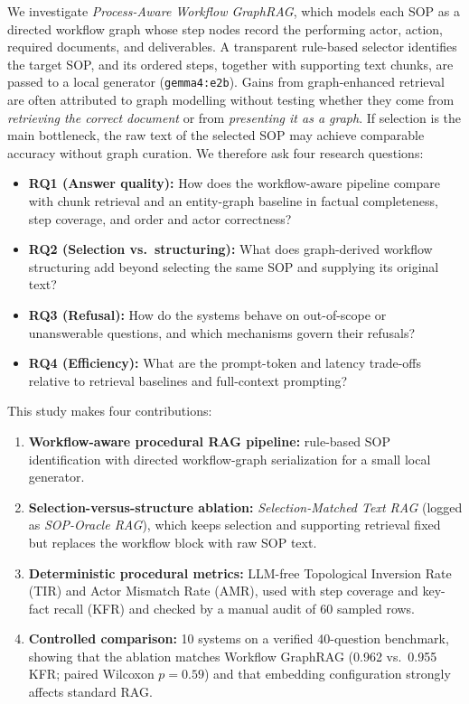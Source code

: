 \documentclass[preprint,10pt]{elsarticle}
\begin{document}
We investigate \emph{Process-Aware Workflow GraphRAG}, which models each SOP as a directed workflow graph \cite{dumas2018fundamentals} whose step nodes record the performing actor, action, required documents, and deliverables. A transparent rule-based selector identifies the target SOP, and its ordered steps, together with supporting text chunks, are passed to a local generator (\texttt{gemma4:e2b}). Gains from graph-enhanced retrieval are often attributed to graph modelling without testing whether they come from \emph{retrieving the correct document} or from \emph{presenting it as a graph}. If selection is the main bottleneck, the raw text of the selected SOP may achieve comparable accuracy without graph curation. We therefore ask four research questions:
\begin{itemize}[leftmargin=*]
\item \textbf{RQ1 (Answer quality):} How does the workflow-aware pipeline compare with chunk retrieval and an entity-graph baseline in factual completeness, step coverage, and order and actor correctness?
\item \textbf{RQ2 (Selection vs.\ structuring):} What does graph-derived workflow structuring add beyond selecting the same SOP and supplying its original text?
\item \textbf{RQ3 (Refusal):} How do the systems behave on out-of-scope or unanswerable questions, and which mechanisms govern their refusals?
\item \textbf{RQ4 (Efficiency):} What are the prompt-token and latency trade-offs relative to retrieval baselines and full-context prompting?
\end{itemize}

This study makes four contributions:
\begin{enumerate}[leftmargin=*]
\item \textbf{Workflow-aware procedural RAG pipeline:} rule-based SOP identification with directed workflow-graph serialization for a small local generator.
\item \textbf{Selection-versus-structure ablation:} \emph{Selection-Matched Text RAG} (logged as \emph{SOP-Oracle RAG}), which keeps selection and supporting retrieval fixed but replaces the workflow block with raw SOP text.
\item \textbf{Deterministic procedural metrics:} LLM-free Topological Inversion Rate (TIR) and Actor Mismatch Rate (AMR), used with step coverage and key-fact recall (KFR) and checked by a manual audit of 60 sampled rows.
\item \textbf{Controlled comparison:} 10 systems on a verified 40-question benchmark, showing that the ablation matches Workflow GraphRAG (0.962 vs.\ 0.955 KFR; paired Wilcoxon $p=0.59$) and that embedding configuration strongly affects standard RAG.
\end{enumerate}
\end{document}
